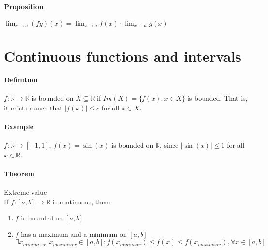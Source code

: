 \documentclass{article}
\newcommand{\abs}[1]{\left|#1\right|}
\newcommand{\func}[3]{#1 : #2 \rightarrow #3}
\newcommand{\functoR}[2]{#1 : #2 \rightarrow \mathbb{R}}
\newcommand{\funcR}[1]{#1 : \mathbb{R} \rightarrow \mathbb{R}}
\newcommand{\limx}[1]{\lim_{x \to #1}}
\newcommand{\intcc}[1]{\left[#1\right]}
\newcommand{\R}{\mathbb{R}}
\newcommand{\Def}{\paragraph{Definition}}
\newcommand{\Proposition}{\paragraph{Proposition}}
\newcommand{\Theorem}{\paragraph{Theorem}}
\newcommand{\Example}{\paragraph{Example}}
\begin{document}
	\Proposition $\limx{a} (fg)(x) = \limx{a} f(x) \cdot \limx{a} g(x)$


\section{Continuous functions and intervals}

	\Def $\funcR{f}$ is bounded on $X \subseteq \R$ if $Im(X) = \{ f(x) : x \in X
	\}$ is bounded. That is, it exists $c$ such that $\abs{f(x)} \leq c$ for all
	$x \in X$.

	\Example $\func{f}{\R}{\intcc{-1,1}}$, $f(x) = \sin(x)$ is bounded on $\R$,
	since $\abs{\sin(x)} \leq 1$ for all $x \in \R$.

	\Theorem Extreme value
\\If $\functoR{f}{\intcc{a,b}}$ is continuous, then:
	\begin{enumerate}[label=(\roman*)]
		\item $f$ is bounded on $\intcc{a,b}$
		\item $f$ has a maximum and a minimum on $\intcc{a,b}$
	\\$\exists x_{minimizer}, x_{maximizer} \in \intcc{a,b} :
	f(x_{mininizer}) \leq f(x) \leq f(x_{maximizer}), \forall x \in \intcc{a,b}$
	\end{enumerate}
\end{document}
